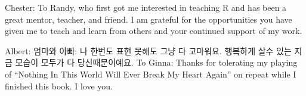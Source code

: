\cleardoublepage\newpage
\thispagestyle{empty}

\begin{center}
Chester: To Randy, who first got me interested in teaching R and has been a great mentor, teacher, and friend. I am grateful for the opportunities you have given me to teach and learn from others and your continued support of my work.

\vspace{0.3in}

Albert: 엄마와 아빠: 나 한번도 표현 못해도 그냥 다 고마워요. 행복하게 살수 있는 지금 모습이 모두가 다 당신때문이예요. To Ginna: Thanks for tolerating my playing of ``Nothing In This World Will Ever Break My Heart Again'' on repeat while I finished this book. I love you.
\end{center}

\setlength{\abovedisplayskip}{-5pt}
\setlength{\abovedisplayshortskip}{-5pt}
